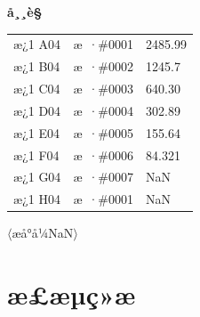 \documentclass[UTF8,10pt,a4paper,fontset=fandol]{ctexart}
\newcommand{\fieldvalue}[1]{#1}
\begin{document}
\textbf{å¸¸è§}

\begin{tabular}{lll}
æ¿1 A04 &%
\fieldvalue{æ ·\#0001}
&
\fieldvalue{2485.99}
\\
æ¿1 B04 &%
\fieldvalue{æ ·\#0002}
&
\fieldvalue{1245.7}
\\
æ¿1 C04 &%
\fieldvalue{æ ·\#0003}
&
\fieldvalue{640.30}
\\
æ¿1 D04 &%
\fieldvalue{æ ·\#0004}
&
\fieldvalue{302.89}
\\
æ¿1 E04 &%
\fieldvalue{æ ·\#0005}
&
\fieldvalue{155.64}
\\
æ¿1 F04 &%
\fieldvalue{æ ·\#0006}
&
\fieldvalue{84.321}
\\
æ¿1 G04 &%
\fieldvalue{æ ·\#0007}
&
\fieldvalue{NaN}
\\
æ¿1 H04 &%
\fieldvalue{æ ·\#0001}
&
\fieldvalue{NaN}
\end{tabular}

\hfill $\langle$æå°å¼\hspace{1em}NaN$\rangle$

\newpage

\section{æ£æµç»æ}
\end{document}
